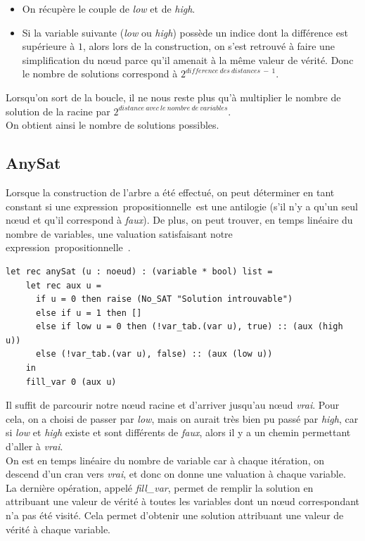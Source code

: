 \documentclass[a4paper, oneside]{report}
\newcommand{\expp}{expression~propositionnelle~}
\begin{document}
\begin{itemize}
\item On récupère le couple de \textit{low} et de \textit{high}.
\item Si la variable suivante (\textit{low} ou \textit{high}) possède un indice dont la différence est supérieure à $1$, alors lors de la construction, on s'est retrouvé à faire une simplification du nœud parce qu'il amenait à la même valeur de vérité. Donc le nombre de solutions correspond à $2^{difference~des~distances~-~1}$.
\end{itemize}
Lorsqu'on sort de la boucle, il ne nous reste plus qu'à multiplier le nombre de solution de la racine par $2^{distance~avec~le~nombre~de~variables}$.\\
On obtient ainsi le nombre de solutions possibles.

\subsection{AnySat}

Lorsque la construction de l'arbre a été effectué, on peut déterminer en tant constant si une \expp est une antilogie (s'il n'y a qu'un seul nœud et qu'il correspond à \textit{faux}). De plus, on peut trouver, en temps linéaire du nombre de variables, une valuation satisfaisant notre \expp.

\begin{lstlisting}
let rec anySat (u : noeud) : (variable * bool) list =
    let rec aux u = 
      if u = 0 then raise (No_SAT "Solution introuvable")
      else if u = 1 then []
      else if low u = 0 then (!var_tab.(var u), true) :: (aux (high u))
      else (!var_tab.(var u), false) :: (aux (low u))
    in
    fill_var 0 (aux u)
\end{lstlisting}
Il suffit de parcourir notre nœud racine et d'arriver jusqu'au nœud \textit{vrai}. Pour cela, on a choisi de passer par \textit{low}, mais on aurait très bien pu passé par \textit{high}, car si \textit{low} et \textit{high} existe et sont différents de \textit{faux}, alors il y a un chemin permettant d'aller à \textit{vrai}.\\
On est en temps linéaire du nombre de variable car à chaque itération, on descend d'un cran vers \textit{vrai}, et donc on donne une valuation à chaque variable.\\
La dernière opération, appelé \textit{fill\_var}, permet de remplir la solution en attribuant une valeur de vérité à toutes les variables dont un nœud correspondant n'a pas été visité. Cela permet d'obtenir une solution attribuant une valeur de vérité à chaque variable.
\end{document}
